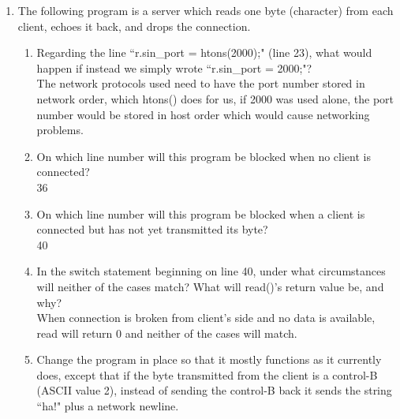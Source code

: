 \documentclass[11pt]{article}
\begin{document}
\begin{enumerate}
	\newpage
	\item The following program is a server which reads one byte (character) from each client, echoes it
	back, and drops the connection.
	
	\newpage
	\begin{enumerate}
		\item  Regarding the line ``r.sin\_port = htons(2000);" (line 23), what would happen if instead we simply wrote ``r.sin\_port = 2000;"?\\
		The network protocols used need to have the port number stored in network order, which htons() does for us, if 2000 was used alone, the port number would be stored in host order which would cause networking problems.
		\item On which line number will this program be blocked when no client is connected?\\
		36
		\item On which line number will this program be blocked when a client is connected but has not yet transmitted its byte?\\
		40
		\item In the switch statement beginning on line 40, under what circumstances will neither of the cases match? What will read()'s return value be, and why?\\
		When connection is broken from client's side and no data is available, read will return 0 and neither of the cases will match.
		\item Change the program in place so that it mostly functions as it currently does, except that if the byte transmitted from the client is a control-B (ASCII value 2), instead of sending the control-B back it sends the string ``ha!" plus a network newline.
		
	\end{enumerate}

\end{enumerate}
\end{document}
